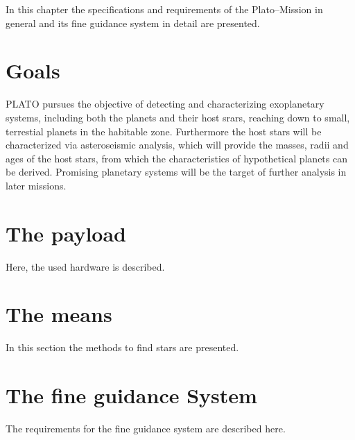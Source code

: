 In this chapter the specifications and requirements of the Plato--Mission in general and its fine guidance system in detail are presented.
\section{Goals}
PLATO pursues the objective of detecting and characterizing exoplanetary systems, including both the planets and their host srars, reaching down to small, terrestial planets in the habitable zone. Furthermore the host stars will be characterized via asteroseismic analysis, which will provide the masses, radii and ages of the host stars, from which the characteristics of hypothetical planets can be derived. Promising planetary systems will be the target of further analysis in later missions. 

\section{The payload}
Here, the used hardware is described.
\section{The means}
In this section the methods to find stars are presented. 
\section{The fine guidance System}
The requirements for the fine guidance system are described here.